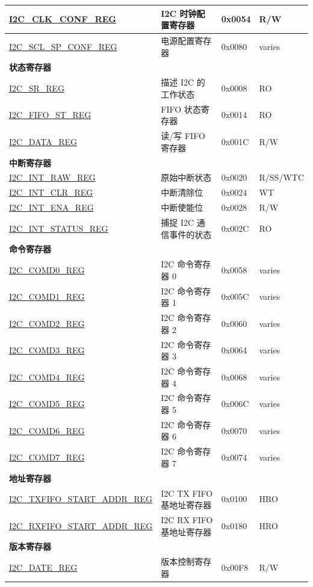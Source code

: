 \begin{longtable}{  | m{5.7cm} | m{7cm} | m{1.3cm} | m{1.5cm} | }
\hyperref[regdesc:I2CCLKCONFREG]{I2C\_CLK\_CONF\_REG} & I2C 时钟配置寄存器 & 0x0054 & R/W \\ \hline
\hyperref[regdesc:I2CSCLSPCONFREG]{I2C\_SCL\_SP\_CONF\_REG} & 电源配置寄存器 & 0x0080 & varies \\ \hline
\multicolumn{4}{|l|}{\textbf{状态寄存器}} \\ \hline
\hyperref[regdesc:I2CSRREG]{I2C\_SR\_REG} & 描述 I2C 的工作状态 & 0x0008 & RO \\ \hline
\hyperref[regdesc:I2CFIFOSTREG]{I2C\_FIFO\_ST\_REG} & FIFO 状态寄存器 & 0x0014 & RO \\ \hline
\hyperref[regdesc:I2CDATAREG]{I2C\_DATA\_REG} & 读/写 FIFO 寄存器 & 0x001C & R/W \\ \hline
\multicolumn{4}{|l|}{\textbf{中断寄存器}} \\ \hline
\hyperref[regdesc:I2CINTRAWREG]{I2C\_INT\_RAW\_REG} & 原始中断状态 & 0x0020 & R/SS/WTC \\ \hline
\hyperref[regdesc:I2CINTCLRREG]{I2C\_INT\_CLR\_REG} & 中断清除位 & 0x0024 & WT \\ \hline
\hyperref[regdesc:I2CINTENAREG]{I2C\_INT\_ENA\_REG} & 中断使能位 & 0x0028 & R/W \\ \hline
\hyperref[regdesc:I2CINTSTATUSREG]{I2C\_INT\_STATUS\_REG} & 捕捉 I2C 通信事件的状态 & 0x002C & RO \\ \hline
\multicolumn{4}{|l|}{\textbf{命令寄存器}} \\ \hline
\hyperref[regdesc:I2CCOMD0REG]{I2C\_COMD0\_REG} & I2C 命令寄存器 0 & 0x0058 & varies \\ \hline
\hyperref[regdesc:I2CCOMD1REG]{I2C\_COMD1\_REG} & I2C 命令寄存器 1 & 0x005C & varies \\ \hline
\hyperref[regdesc:I2CCOMD2REG]{I2C\_COMD2\_REG} & I2C 命令寄存器 2 & 0x0060 & varies \\ \hline
\hyperref[regdesc:I2CCOMD3REG]{I2C\_COMD3\_REG} & I2C 命令寄存器 3 & 0x0064 & varies \\ \hline
\hyperref[regdesc:I2CCOMD4REG]{I2C\_COMD4\_REG} & I2C 命令寄存器 4 & 0x0068 & varies \\ \hline
\hyperref[regdesc:I2CCOMD5REG]{I2C\_COMD5\_REG} & I2C 命令寄存器 5 & 0x006C & varies \\ \hline
\hyperref[regdesc:I2CCOMD6REG]{I2C\_COMD6\_REG} & I2C 命令寄存器 6 & 0x0070 & varies \\ \hline
\hyperref[regdesc:I2CCOMD7REG]{I2C\_COMD7\_REG} & I2C 命令寄存器 7 & 0x0074 & varies \\ \hline
\multicolumn{4}{|l|}{\textbf{地址寄存器}} \\ \hline
\hyperref[regdesc:I2CTXFIFOSTARTADDRREG]{I2C\_TXFIFO\_START\_ADDR\_REG} & I2C TX FIFO 基地址寄存器 & 0x0100 & HRO \\ \hline
\hyperref[regdesc:I2CRXFIFOSTARTADDRREG]{I2C\_RXFIFO\_START\_ADDR\_REG} & I2C RX FIFO 基地址寄存器 & 0x0180 & HRO \\ \hline
\multicolumn{4}{|l|}{\textbf{版本寄存器}} \\ \hline
\hyperref[regdesc:I2CDATEREG]{I2C\_DATE\_REG} & 版本控制寄存器 & 0x00F8 & R/W \\ \hline
\end{longtable}
